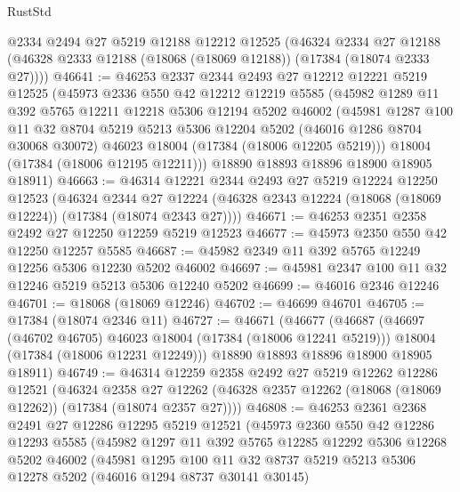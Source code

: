 \begin{lexlean}{RustStd}
\begin{coremodule}
    @2334
    @2494
    @27
    @5219
    @12188
    @12212
    @12525
    (@46324
      @2334
      @27
      @12188
      (@46328 @2333 @12188 (@18068 (@18069 @12188)) (@17384 (@18074 @2333 @27))))
@46641 := @46253
    @2337
    @2344
    @2493
    @27
    @12212
    @12221
    @5219
    @12525
    (@45973
      @2336
      @550
      @42
      @12212
      @12219
      @5585
      (@45982
        @1289
        @11
        @392
        @5765
        @12211
        @12218
        @5306
        @12194
        @5202
        @46002
        (@45981
          @1287
          @100
          @11
          @32
          @8704
          @5219
          @5213
          @5306
          @12204
          @5202
          (@46016 @1286 @8704 @30068 @30072)
          @46023
          @18004
          (@17384 (@18006 @12205 @5219)))
        @18004
        (@17384 (@18006 @12195 @12211)))
      @18890
      @18893
      @18896
      @18900
      @18905
      @18911)
@46663 := @46314
    @12221
    @2344
    @2493
    @27
    @5219
    @12224
    @12250
    @12523
    (@46324
      @2344
      @27
      @12224
      (@46328 @2343 @12224 (@18068 (@18069 @12224)) (@17384 (@18074 @2343 @27))))
@46671 := @46253 @2351 @2358 @2492 @27 @12250 @12259 @5219 @12523
@46677 := @45973 @2350 @550 @42 @12250 @12257 @5585
@46687 := @45982 @2349 @11 @392 @5765 @12249 @12256 @5306 @12230 @5202 @46002
@46697 := @45981 @2347 @100 @11 @32 @12246 @5219 @5213 @5306 @12240 @5202
@46699 := @46016 @2346 @12246
@46701 := @18068 (@18069 @12246)
@46702 := @46699 @46701
@46705 := @17384 (@18074 @2346 @11)
@46727 := @46671
    (@46677
      (@46687
        (@46697 (@46702 @46705) @46023 @18004 (@17384 (@18006 @12241 @5219)))
        @18004
        (@17384 (@18006 @12231 @12249)))
      @18890
      @18893
      @18896
      @18900
      @18905
      @18911)
@46749 := @46314
    @12259
    @2358
    @2492
    @27
    @5219
    @12262
    @12286
    @12521
    (@46324
      @2358
      @27
      @12262
      (@46328 @2357 @12262 (@18068 (@18069 @12262)) (@17384 (@18074 @2357 @27))))
@46808 := @46253
    @2361
    @2368
    @2491
    @27
    @12286
    @12295
    @5219
    @12521
    (@45973
      @2360
      @550
      @42
      @12286
      @12293
      @5585
      (@45982
        @1297
        @11
        @392
        @5765
        @12285
        @12292
        @5306
        @12268
        @5202
        @46002
        (@45981
          @1295
          @100
          @11
          @32
          @8737
          @5219
          @5213
          @5306
          @12278
          @5202
          (@46016 @1294 @8737 @30141 @30145)

\end{coremodule}
\end{lexlean}
